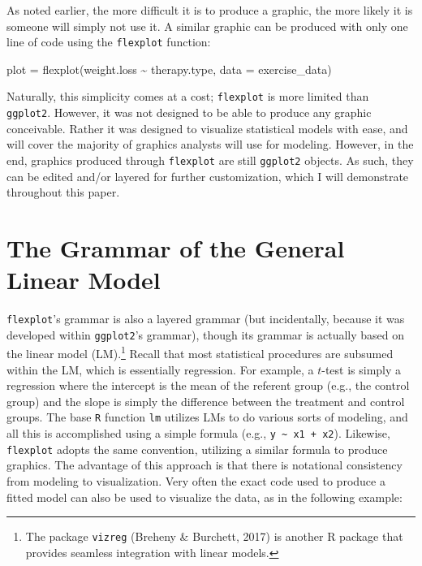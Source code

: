 \documentclass[
  english,
  man]{apa6}
\newenvironment{Shaded}{\begin{snugshade}}{\end{snugshade}}
\newcommand{\AttributeTok}[1]{\textcolor[rgb]{0.77,0.63,0.00}{#1}}
\newcommand{\FunctionTok}[1]{\textcolor[rgb]{0.00,0.00,0.00}{#1}}
\newcommand{\NormalTok}[1]{#1}
\newcommand{\OtherTok}[1]{\textcolor[rgb]{0.56,0.35,0.01}{#1}}
\newcommand{\SpecialCharTok}[1]{\textcolor[rgb]{0.00,0.00,0.00}{#1}}
\begin{document}
As noted earlier, the more difficult it is to produce a graphic, the more likely it is someone will simply not use it. A similar graphic can be produced with only one line of code using the \texttt{flexplot} function:

\small

\begin{Shaded}
\begin{Highlighting}[]
\NormalTok{plot }\OtherTok{=} \FunctionTok{flexplot}\NormalTok{(weight.loss }\SpecialCharTok{\textasciitilde{}}\NormalTok{ therapy.type, }\AttributeTok{data =}\NormalTok{ exercise\_data)}
\end{Highlighting}
\end{Shaded}

\normalsize

Naturally, this simplicity comes at a cost; \texttt{flexplot} is more limited than \texttt{ggplot2}. However, it was not designed to be able to produce any graphic conceivable. Rather it was designed to visualize statistical models with ease, and will cover the majority of graphics analysts will use for modeling. However, in the end, graphics produced through \texttt{flexplot} are still \texttt{ggplot2} objects. As such, they can be edited and/or layered for further customization, which I will demonstrate throughout this paper.

\hypertarget{the-grammar-of-the-general-linear-model}{%
\section{The Grammar of the General Linear Model}\label{the-grammar-of-the-general-linear-model}}

\texttt{flexplot}'s grammar is also a layered grammar (but incidentally, because it was developed within \texttt{ggplot2}'s grammar), though its grammar is actually based on the linear model (LM).\footnote{The package \texttt{vizreg} (Breheny \& Burchett, 2017) is another R package that provides seamless integration with linear models.} Recall that most statistical procedures are subsumed within the LM, which is essentially regression. For example, a \(t\)-test is simply a regression where the intercept is the mean of the referent group (e.g., the control group) and the slope is simply the difference between the treatment and control groups. The base \texttt{R} function \texttt{lm} utilizes LMs to do various sorts of modeling, and all this is accomplished using a simple formula (e.g., \texttt{y\ \textasciitilde{}\ x1\ +\ x2}). Likewise, \texttt{flexplot} adopts the same convention, utilizing a similar formula to produce graphics. The advantage of this approach is that there is notational consistency from modeling to visualization. Very often the exact code used to produce a fitted model can also be used to visualize the data, as in the following example:
\end{document}
